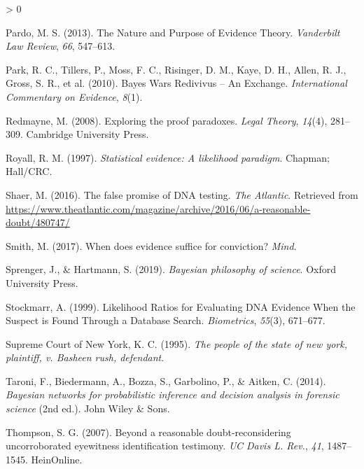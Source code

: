 \documentclass[
  10pt,
  dvipsnames,enabledeprecatedfontcommands]{scrartcl}
\newlength{\cslhangindent}
\newenvironment{CSLReferences}[2] %
 {%
  \setlength{\parindent}{0pt}
  \ifodd #1 \everypar{\setlength{\hangindent}{\cslhangindent}}\ignorespaces\fi
  \ifnum #2 > 0
  \setlength{\parskip}{#2\baselineskip}
  \fi
 }%
 {}
\begin{document}
\begin{CSLReferences}{1}{0}
\leavevmode\hypertarget{ref-pardo2013NaturePurposeEvidence}{}%
Pardo, M. S. (2013). The {Nature} and {Purpose} of {Evidence Theory}.
\emph{Vanderbilt Law Review}, \emph{66}, 547--613.

\leavevmode\hypertarget{ref-park2010BayesWarsRedivivus}{}%
Park, R. C., Tillers, P., Moss, F. C., Risinger, D. M., Kaye, D. H.,
Allen, R. J., Gross, S. R., et al. (2010). Bayes {Wars Redivivus} -- {An
Exchange}. \emph{International Commentary on Evidence}, \emph{8}(1).

\leavevmode\hypertarget{ref-redmayne2008exploring}{}%
Redmayne, M. (2008). Exploring the proof paradoxes. \emph{Legal Theory},
\emph{14}(4), 281--309. Cambridge University Press.

\leavevmode\hypertarget{ref-Royall1997}{}%
Royall, R. M. (1997). \emph{Statistical evidence: A likelihood
paradigm}. Chapman; Hall/CRC.

\leavevmode\hypertarget{ref-Shaer2016False}{}%
Shaer, M. (2016). The false promise of DNA testing. \emph{The Atlantic}.
Retrieved from
\url{https://www.theatlantic.com/magazine/archive/2016/06/a-reasonable-doubt/480747/}

\leavevmode\hypertarget{ref-Smith2018evidence}{}%
Smith, M. (2017). When does evidence suffice for conviction?
\emph{Mind}.

\leavevmode\hypertarget{ref-sprenger2019bayesian}{}%
Sprenger, J., \& Hartmann, S. (2019). \emph{Bayesian philosophy of
science}. Oxford University Press.

\leavevmode\hypertarget{ref-stockmarr1999LikelihoodRatiosEvaluating}{}%
Stockmarr, A. (1999). Likelihood {Ratios} for {Evaluating DNA Evidence
When} the {Suspect} is {Found Through} a {Database Search}.
\emph{Biometrics}, \emph{55}(3), 671--677.

\leavevmode\hypertarget{ref-Rush1995}{}%
Supreme Court of New York, K. C. (1995). \emph{The people of the state
of new york, plaintiff, v. Basheen rush, defendant}.

\leavevmode\hypertarget{ref-taroni2006bayesian}{}%
Taroni, F., Biedermann, A., Bozza, S., Garbolino, P., \& Aitken, C.
(2014). \emph{Bayesian networks for probabilistic inference and decision
analysis in forensic science} (2nd ed.). John Wiley \& Sons.

\leavevmode\hypertarget{ref-thompson2007beyond}{}%
Thompson, S. G. (2007). Beyond a reasonable doubt-reconsidering
uncorroborated eyewitness identification testimony. \emph{UC Davis L.
Rev.}, \emph{41}, 1487--1545. HeinOnline.


\end{CSLReferences}
\end{document}
